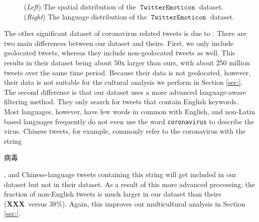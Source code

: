 \documentclass[11pt]{article}
\newcommand{\XXX}{\textbf{XXX}~}
\DeclareMathOperator{\emoticon}{\texttt{TwitterEmoticon}}
\begin{document}
\begin{figure}%
    \centering
    \label{adsad}
    \caption{ (\emph{Left}) The spatial distribution of the $\emoticon$ dataset. (\emph{Right}) The language distribution of the $\emoticon$ dataset.  }%
    \label{fig:example}%
\end{figure}


The other significant dataset of coronavirus related tweets is due to \citet{chen2020tracking}.
There are two main differences between our dataset and theirs.
First, we only include geolocated tweets,
whereas they include non-geolocated tweets as well.
This results in their dataset being about 50x larger than ours,
with about 250 million tweets over the same time period.
Because their data is not geolocated, however, their data is not suitable for the cultural analysis we perform in Section \ref{sec:}.
The second difference is that our dataset uses a more advanced language-aware filtering method.
They only search for tweets that contain English keywords.
Most languages, however, have few words in common with English,
and non-Latin based languages frequently do not even use the word \texttt{coronavirus} to describe the virus.
Chinese tweets, for example, commonly refer to the coronavirus with the string
\begin{CJK}{UTF8}{gbsn}
病毒
\end{CJK},
and Chinese-language tweets containing this string will get included in our dataset but not in their dataset.
As a result of this more advanced processing, the fraction of non-English tweets is much larger in our dataset than theirs (\XXX versus 38\%).
Again, this improves our multicultural analysis in Section \ref{sec:}.
\end{document}
